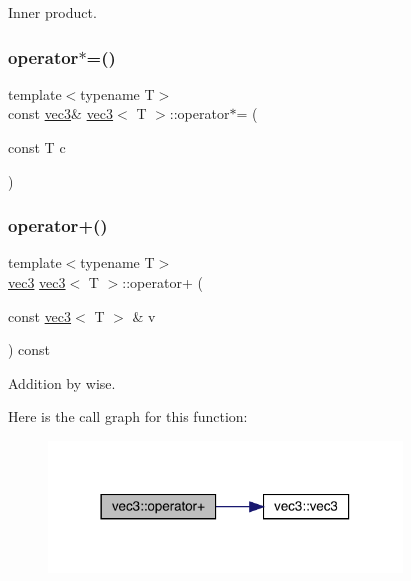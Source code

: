 Inner product. 

\mbox{\label{structvec3_a7989a4ee0a46d2ec4286795ab6852636}} 
\subsubsection{\texorpdfstring{operator$\ast$=()}{operator*=()}}
{\footnotesize\ttfamily template$<$typename T$>$ \\
const \mbox{\hyperlink{structvec3}{vec3}}\& \mbox{\hyperlink{structvec3}{vec3}}$<$ T $>$\+::operator$\ast$= (\begin{DoxyParamCaption}\item[{const T}]{c }\end{DoxyParamCaption})\hspace{0.3cm}{\ttfamily [inline]}}

\mbox{\label{structvec3_a255037f59863e54390e388dd07e7ee8f}} 
\subsubsection{\texorpdfstring{operator+()}{operator+()}\hspace{0.1cm}{\footnotesize\ttfamily [1/2]}}
{\footnotesize\ttfamily template$<$typename T$>$ \\
\mbox{\hyperlink{structvec3}{vec3}} \mbox{\hyperlink{structvec3}{vec3}}$<$ T $>$\+::operator+ (\begin{DoxyParamCaption}\item[{const \mbox{\hyperlink{structvec3}{vec3}}$<$ T $>$ \&}]{v }\end{DoxyParamCaption}) const\hspace{0.3cm}{\ttfamily [inline]}}



Addition by wise. 

Here is the call graph for this function\+:\nopagebreak
\begin{figure}[H]
\begin{center}
\leavevmode
\includegraphics[width=266pt]{structvec3_a255037f59863e54390e388dd07e7ee8f_cgraph}
\end{center}
\end{figure}
\mbox{\label{structvec3_a1b9727670ffa0a403e628bfdc966da45}} 
